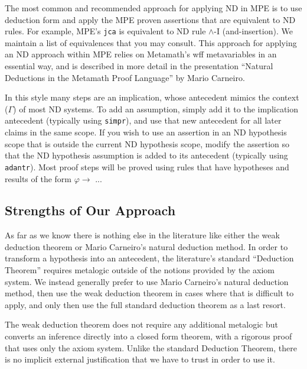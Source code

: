 The most common and recommended approach for applying ND in MPE is to use
deduction form%
and apply the MPE proven assertions that are equivalent to ND rules.
For example, MPE's \texttt{jca} is equivalent to ND rule $\land$-I
(and-insertion).
We maintain a list of equivalences that you may consult.
This approach for applying an ND approach within MPE relies on Metamath's
wff metavariables in an essential way, and is described in more detail
in the presentation ``Natural Deductions in the Metamath Proof Language''
by Mario Carneiro\cite{CarneiroND}.

In this style many steps are an implication, whose antecedent mimics
the context ($\Gamma$) of most ND systems. To add an assumption, simply add
it to the implication antecedent (typically using
\texttt{simpr}),
and use that
new antecedent for all later claims in the same scope. If you wish to
use an assertion in an ND hypothesis scope that is outside the current
ND hypothesis scope, modify the assertion so that the ND hypothesis
assumption is added to its antecedent (typically using \texttt{adantr}). Most
proof steps will be proved using rules that have hypotheses and results
of the form $\varphi \rightarrow$ ...

\subsection{Strengths of Our Approach}

As far as we know there is nothing else in the literature like either the
weak deduction theorem or Mario Carneiro's
natural deduction method.
In order to
transform a hypothesis into an antecedent, the literature's standard
``Deduction Theorem''
requires metalogic outside of the notions provided
by the axiom system. We instead generally prefer to use Mario Carneiro's
natural deduction method, then use the weak deduction theorem in cases
where that is difficult to apply, and only then use the full standard
deduction theorem as a last resort.

The weak deduction theorem
does not require any additional metalogic
but converts an inference directly into a closed form theorem, with
a rigorous proof that uses only the axiom system. Unlike the standard
Deduction Theorem, there is no implicit external justification that we
have to trust in order to use it.


